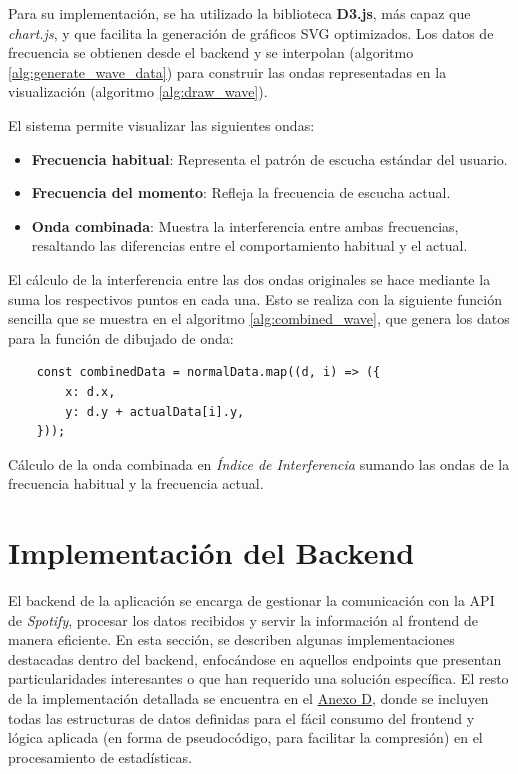 Para su implementación, se ha utilizado la biblioteca \textbf{D3.js}, más capaz que \textit{chart.js}, y que facilita la generación de gráficos SVG optimizados. Los datos de frecuencia se obtienen desde el backend y se interpolan (algoritmo \ref{alg:generate_wave_data}) para construir las ondas representadas en la visualización (algoritmo \ref{alg:draw_wave}).

El sistema permite visualizar las siguientes ondas:
\begin{itemize}
    \item \textbf{Frecuencia habitual}: Representa el patrón de escucha estándar del usuario.
    \item \textbf{Frecuencia del momento}: Refleja la frecuencia de escucha actual.
    \item \textbf{Onda combinada}: Muestra la interferencia entre ambas frecuencias, resaltando las diferencias entre el comportamiento habitual y el actual.
\end{itemize}

El cálculo de la interferencia entre las dos ondas originales se hace mediante la suma los respectivos puntos en cada una. Esto se realiza con la siguiente función sencilla que se muestra en el algoritmo \ref{alg:combined_wave}, que genera los datos para la función de dibujado de onda:

\begin{ifalgorithm}[H]
    \begin{lstlisting}
    const combinedData = normalData.map((d, i) => ({
        x: d.x,
        y: d.y + actualData[i].y,
    }));
    \end{lstlisting}
    \caption{Cálculo de la onda combinada en \textit{Índice de Interferencia} sumando las ondas de la frecuencia habitual y la frecuencia actual.}
    \label{alg:combined_wave}
\end{ifalgorithm}

\newpage

\section{Implementación del Backend}

El backend de la aplicación se encarga de gestionar la comunicación con la API de \textit{Spotify}, procesar los datos recibidos y servir la información al frontend de manera eficiente. En esta sección, se describen algunas implementaciones destacadas dentro del backend, enfocándose en aquellos endpoints que presentan particularidades interesantes o que han requerido una solución específica. El resto de la implementación detallada se encuentra en el \hyperref[ch:anexoD]{Anexo D}, donde se incluyen todas las estructuras de datos definidas para el fácil consumo del frontend y lógica aplicada (en forma de pseudocódigo, para facilitar la compresión) en el procesamiento de estadísticas.

